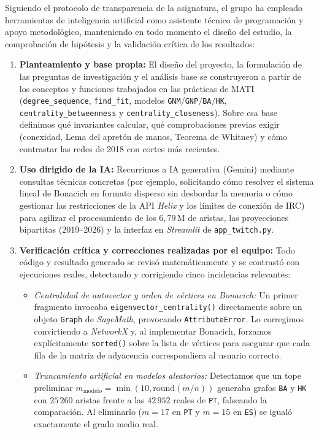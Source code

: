 \documentclass[11pt,a4paper]{article}
\begin{document}
Siguiendo el protocolo de transparencia de la asignatura, el grupo ha empleado herramientas de inteligencia artificial como asistente técnico de programación y apoyo metodológico, manteniendo en todo momento el diseño del estudio, la comprobación de hipótesis y la validación crítica de los resultados:
\begin{enumerate}[leftmargin=*, itemsep=2pt]
  \item \textbf{Planteamiento y base propia:} El diseño del proyecto, la formulación de las preguntas de investigación y el análisis base se construyeron a partir de los conceptos y funciones trabajados en las prácticas de MATI~\cite{reyes2026} (\texttt{degree\_\allowbreak sequence}, \texttt{find\_\allowbreak fit}, modelos \texttt{GNM}/\texttt{GNP}/\texttt{BA}/\texttt{HK}, \texttt{centrality\_\allowbreak betweenness} y \texttt{centrality\_\allowbreak closeness}). Sobre esa base definimos qué invariantes calcular, qué comprobaciones previas exigir (conexidad, Lema del apretón de manos, Teorema de Whitney) y cómo contrastar las redes de 2018 con cortes más recientes.
  \item \textbf{Uso dirigido de la IA:} Recurrimos a IA generativa (Gemini) mediante consultas técnicas concretas (por ejemplo, solicitando cómo resolver el sistema lineal de Bonacich en formato disperso sin desbordar la memoria o cómo gestionar las restricciones de la API \textit{Helix} y los límites de conexión de IRC) para agilizar el procesamiento de los $6,79$\,M de aristas, las proyecciones bipartitas (2019--2026) y la interfaz en \textit{Streamlit} de \texttt{app\_twitch.py}.
  \item \textbf{Verificación crítica y correcciones realizadas por el equipo:} Todo código y resultado generado se revisó matemáticamente y se contrastó con ejecuciones reales, detectando y corrigiendo cinco incidencias relevantes:
  \begin{itemize}[leftmargin=*, itemsep=1pt]
    \item \textit{Centralidad de autovector y orden de vértices en Bonacich:} Un primer fragmento invocaba \texttt{eigenvector\_\allowbreak centrality()} directamente sobre un objeto \texttt{Graph} de \textit{SageMath}, provocando \texttt{AttributeError}. Lo corregimos convirtiendo a \textit{NetworkX} y, al implementar Bonacich, forzamos explícitamente \texttt{sorted()} sobre la lista de vértices para asegurar que cada fila de la matriz de adyacencia correspondiera al usuario correcto.
    \item \textit{Truncamiento artificial en modelos aleatorios:} Detectamos que un tope preliminar $m_{\text{modelo}} = \min(10, \text{round}(m/n))$ generaba grafos \texttt{BA} y \texttt{HK} con $25\,260$ aristas frente a las $42\,952$ reales de \texttt{PT}, falseando la comparación. Al eliminarlo ($m = 17$ en \texttt{PT} y $m = 15$ en \texttt{ES}) se igualó exactamente el grado medio real.

\end{itemize}
\end{enumerate}
\end{document}
